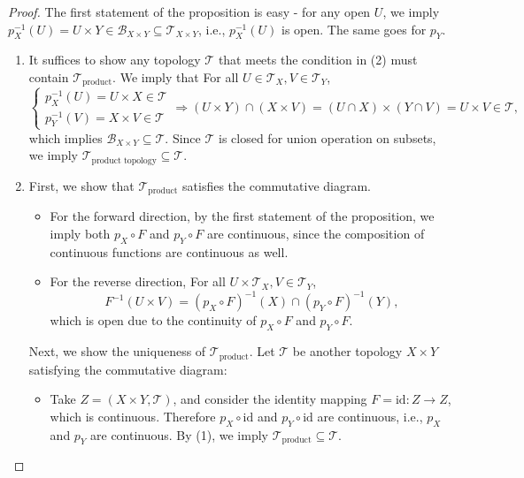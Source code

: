 \begin{example}
\begin{proof} The first statement of the proposition is easy - for any open \(U\), we imply \(p_X^{-1}\left(U\right)  = U \times  Y \in  {\mathcal{B}}_{X \times  Y} \subseteq  {\mathcal{T}}_{X \times  Y}\), i.e., \(p_X^{-1}\left(U\right)\) is open. The same goes for \(p_Y\).

\begin{enumerate}
    \item  It suffices to show any topology \(\mathcal{T}\) that meets the condition in (2) must contain \({\mathcal{T}}_{\text{product}}\). We imply that For all \(U \in  {\mathcal{T}}_X,V \in  {\mathcal{T}}_Y\),
\[
\left\{  {\begin{array}{l} p_X^{-1}\left(U\right)  = U \times  X \in  \mathcal{T} \\  p_Y^{-1}\left(V\right)  = X \times  V \in  \mathcal{T} \end{array} \Rightarrow  \left({U \times  Y}\right)  \cap  \left({X \times  V}\right)  = \left({U \cap  X}\right)  \times  \left({Y \cap  V}\right)  = U \times  V \in  \mathcal{T},}\right.
\]
which implies \({\mathcal{B}}_{X \times  Y} \subseteq  \mathcal{T}\). Since \(\mathcal{T}\) is closed for union operation on subsets, we
imply \({\mathcal{T}}_{\text{product topology}} \subseteq  \mathcal{T}\).

\item First, we show that \({\mathcal{T}}_{\text{product}}\) satisfies the commutative diagram.
\begin{itemize}
\item For the forward direction, by the first statement of the proposition, we imply both \(p_X \circ  F\) and \(p_Y \circ  F\) are continuous, since the composition of continuous functions are continuous as well.

\item For the reverse direction, For all \(U \times  {\mathcal{T}}_X,V \in  {\mathcal{T}}_Y\),
\[
{F}^{-1}\left({U \times  V}\right)  = {\left(p_X \circ  F\right)}^{-1}\left(X\right)  \cap  {\left(p_Y \circ  F\right)}^{-1}\left(Y\right),
\]
which is open due to the continuity of \(p_X \circ  F\) and \(p_Y \circ  F\).
\end{itemize}

Next, we show the uniqueness of \({\mathcal{T}}_{\text{product}}\). Let \(\mathcal{T}\) be another topology \(X \times  Y\) satisfying the commutative diagram:
\begin{itemize}
\item Take \(Z = \left({X \times  Y,\mathcal{T}}\right)\), and consider the identity mapping \(F = \mathrm{{id}} : Z \rightarrow  Z\), which is continuous. Therefore \(p_X \circ  \mathrm{{id}}\) and \(p_Y \circ  \mathrm{{id}}\) are continuous, i.e., \(p_X\) and \(p_Y\) are continuous. By (1), we imply \({\mathcal{T}}_{\text{product}} \subseteq  \mathcal{T}\).


\end{itemize}
\end{enumerate}
\end{proof}
\end{example}
